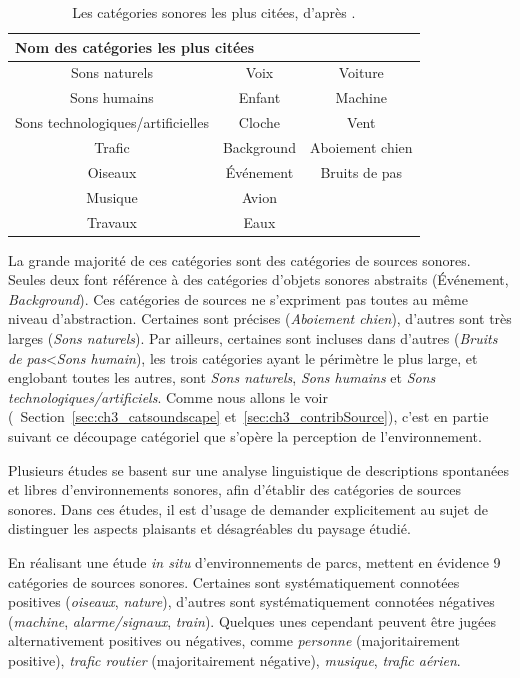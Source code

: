 \begin{table}[t]
\centering
\begin{tabular}{ccc}    
\multicolumn{3}{l}{Nom des catégories les plus citées} \\             
\hline
Sons naturels                    & Voix       & Voiture\\
Sons humains                     & Enfant     & Machine\\
Sons technologiques/artificielles & Cloche     & Vent \\
Trafic                           & Background & Aboiement chien\\
Oiseaux                          & Événement  & Bruits de pas\\
Musique                          & Avion      & \\
Travaux                          & Eaux       & \\
\hline
\end{tabular}
\vspace{0.5mm}
\caption[Les catégories sonores les plus citées.]{Les catégories sonores les plus citées, d'après \citep{niessen2010categories}.}
\label{tab:categoNiessen}
\end{table}

La grande majorité de ces catégories sont des catégories de sources sonores. Seules deux font référence à des catégories d'objets sonores abstraits (Événement, \emph{Background}). Ces catégories de sources ne s'expriment pas toutes au même niveau d'abstraction. Certaines sont précises (\emph{Aboiement chien}), d'autres sont très larges (\emph{Sons naturels}). Par ailleurs, certaines sont incluses dans d'autres (\emph{Bruits de pas}<\emph{Sons humain}), les trois catégories ayant le périmètre le plus large, et englobant toutes les autres, sont \emph{Sons naturels}, \emph{Sons humains} et \emph{Sons technologiques/artificiels}. Comme nous allons le voir (\cf~Section~\ref{sec:ch3_catsoundscape} et~\ref{sec:ch3_contribSource}), c'est en partie suivant ce découpage catégoriel que s'opère la perception de l'environnement.

Plusieurs études se basent sur une analyse linguistique de descriptions spontanées et libres d'environnements sonores, afin d'établir des catégories de sources sonores. Dans ces études, il est d'usage de demander explicitement au sujet de distinguer les aspects plaisants et désagréables du paysage étudié.

En réalisant une étude \emph{in situ} d'environnements de parcs, \citep{szeremeta2009analysis} mettent en évidence 9 catégories de sources sonores. Certaines sont systématiquement connotées positives (\emph{oiseaux}, \emph{nature}), d'autres sont systématiquement connotées négatives (\emph{machine}, \emph{alarme/signaux}, \emph{train}). Quelques unes cependant peuvent être jugées alternativement positives ou négatives, comme \emph{personne} (majoritairement positive), \emph{trafic routier} (majoritairement négative), \emph{musique}, \emph{trafic aérien}.

